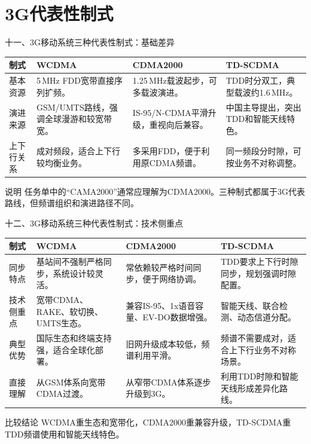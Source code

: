 \documentclass[aspectratio=169]{beamer}
\renewcommand{\arraystretch}{1.16}
\begin{document}
\section{3G代表性制式}

\begin{frame}[t]{十一、3G移动系统三种代表性制式：基础差异}
    \scriptsize
    \renewcommand{\arraystretch}{1.10}
    \begin{tabularx}{\textwidth}{>{\heiti}p{}YYY}
        \toprule
        制式 & WCDMA & CDMA2000 & TD-SCDMA \\
        \midrule
        基本资源 & 5\,MHz FDD宽带直接序列扩频。 & 1.25\,MHz载波起步，可多载波演进。 & TDD时分双工，典型载波约1.6\,MHz。\\
        演进来源 & GSM/UMTS路线，强调全球漫游和较宽带宽。 & IS-95/N-CDMA平滑升级，重视向后兼容。 & 中国主导提出，突出TDD和智能天线特色。\\
        上下行关系 & 成对频段，适合上下行较均衡业务。 & 多采用FDD，便于利用原CDMA频谱。 & 同一频段分时隙，可按业务不对称调整。\\
        \bottomrule
    \end{tabularx}
    \renewcommand{\arraystretch}{1.16}

    \vspace{0.45em}
    \begin{block}{说明}
        任务单中的“CAMA2000”通常应理解为CDMA2000。三种制式都属于3G代表路线，但频谱组织和演进路径不同。
    \end{block}
\end{frame}

\begin{frame}[t]{十二、3G移动系统三种代表性制式：技术侧重点}
    \scriptsize
    \renewcommand{\arraystretch}{1.10}
    \begin{tabularx}{\textwidth}{>{\heiti}p{}YYY}
        \toprule
        制式 & WCDMA & CDMA2000 & TD-SCDMA \\
        \midrule
        同步特点 & 基站间不强制严格同步，系统设计较灵活。 & 常依赖较严格时间同步，便于网络协调。 & TDD要求上下行时隙同步，规划强调时隙配置。\\
        技术侧重点 & 宽带CDMA、RAKE、软切换、UMTS生态。 & 兼容IS-95、1x语音容量、EV-DO数据增强。 & 智能天线、联合检测、动态信道分配。\\
        典型优势 & 国际生态和终端支持强，适合全球化部署。 & 旧网升级成本较低，频谱利用平滑。 & 频谱不需要成对，适合上下行业务不对称场景。\\
        直接理解 & 从GSM体系向宽带CDMA过渡。 & 从窄带CDMA体系逐步升级到3G。 & 利用TDD时隙和智能天线形成差异化路线。\\
        \bottomrule
    \end{tabularx}
    \renewcommand{\arraystretch}{1.16}

    \vspace{0.45em}
    \begin{block}{比较结论}
        WCDMA重生态和宽带化，CDMA2000重兼容升级，TD-SCDMA重TDD频谱使用和智能天线特色。
    \end{block}
\end{frame}
\end{document}
